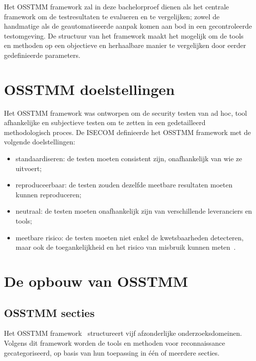 Het OSSTMM framework zal in deze bachelorproef dienen als het centrale framework om de testresultaten te evalueren en te vergelijken; zowel de handmatige als de geautomatiseerde aanpak komen aan bod in een gecontroleerde testomgeving.
De structuur van het framework maakt het mogelijk om de tools en methoden op een objectieve en herhaalbare manier te vergelijken door eerder gedefinieerde parameters.

\section{OSSTMM doelstellingen}
Het OSSTMM framework was ontworpen om de security testen van ad hoc, tool afhankelijke en subjectieve testen om te zetten in een gedetailleerd methodologisch proces.
De ISECOM definieerde het OSSTMM framework met de volgende doelstellingen:

\begin{itemize}
  \item standaardiseren: de testen moeten consistent zijn, onafhankelijk van wie ze uitvoert;
  \item reproduceerbaar: de testen zouden dezelfde meetbare resultaten moeten kunnen reproduceren;
  \item neutraal: de testen moeten onafhankelijk zijn van verschillende leveranciers en tools;
  \item meetbare risico: de testen moeten niet enkel de kwetsbaarheden detecteren, maar ook de toegankelijkheid en het risico van misbruik kunnen meten~\autocite{Herzog}.
\end{itemize}

\section{De opbouw van OSSTMM}

\subsection{OSSTMM secties}
Het OSSTMM framework~\autocite{Herzog} structureert vijf afzonderlijke onderzoeksdomeinen.
Volgens dit framework worden de tools en methoden voor reconnaissance gecategoriseerd, op basis van hun toepassing in één of meerdere secties.


